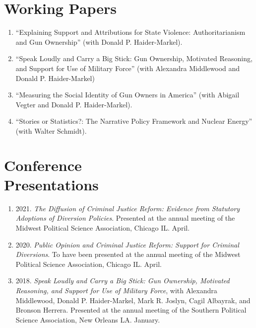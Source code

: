 \documentclass[margin,line,pifont,palatino,courier]{res}
\begin{document}
\begin{resume}
\begin{enumerate}
\end{enumerate}

\section{\sc Working Papers}

\begin{enumerate}
\item ``Explaining Support and Attributions for State Violence:
Authoritarianism and Gun Ownership'' (with Donald P. Haider-Markel).

\item ``Speak Loudly and Carry a Big Stick: Gun Ownership, Motivated
Reasoning, and Support for Use of Military Force'' (with Alexandra
Middlewood and Donald P. Haider-Markel)

\item ``Measuring the Social Identity of Gun Owners in America'' (with
  Abigail Vegter and Donald P. Haider-Markel).

\item ``Stories or Statistics?: The Narrative Policy Framework and
  Nuclear Energy'' (with Walter Schmidt).
\end{enumerate}

\section{\sc Conference \\ Presentations}

\begin{enumerate}

\item 2021. \emph{The Diffusion of Criminal Justice Reform: Evidence
    from Statutory Adoptions of Diversion Policies}. Presented at
  the annual meeting of the Midwest Political Science Association,
  Chicago IL. April.

\item 2020. \emph{Public Opinion and Criminal Justice Reform: Support for
  Criminal Diversions}. To have been presented at the annual meeting of
the Midwest Political Science Association, Chicago IL. April.

\item 2018. \emph{Speak Loudly and Carry a Big Stick: Gun Ownership, Motivated
  Reasoning, and Support for Use of Military Force}, with Alexandra
Middlewood, Donald P. Haider-Markel, Mark R. Joslyn, Cagil Albayrak,
and Bronson Herrera. Presented at the annual meeting of the Southern
Political Science Association, New Orleans LA. January.
\end{enumerate}


\end{resume}
\end{document}
